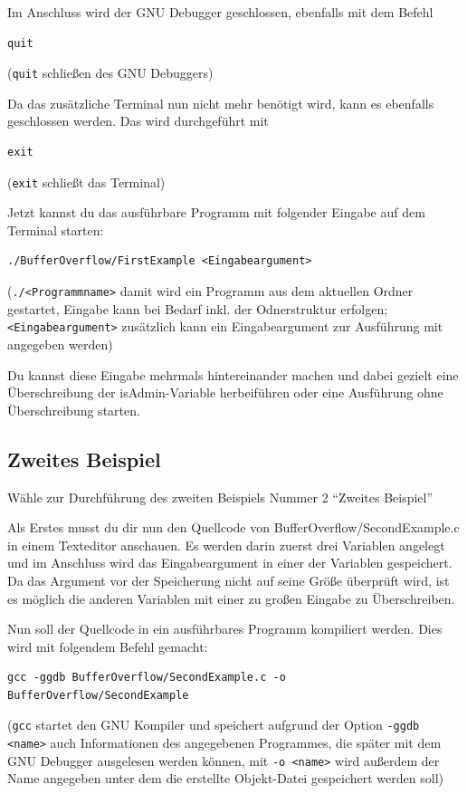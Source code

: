 Im Anschluss wird der GNU Debugger geschlossen, ebenfalls mit dem Befehl
\begin{lstlisting}
quit
\end{lstlisting}
(\colorbox{altgray}{\lstinline|quit|} schließen des GNU Debuggers)

Da das zusätzliche Terminal nun nicht mehr benötigt wird, kann es ebenfalls geschlossen werden. Das wird durchgeführt mit
\begin{lstlisting}
exit
\end{lstlisting}
(\colorbox{altgray}{\lstinline|exit|} schließt das Terminal)

Jetzt kannst du das ausführbare Programm mit folgender Eingabe auf dem Terminal starten:
\begin{lstlisting}
./BufferOverflow/FirstExample <Eingabeargument>
\end{lstlisting}
(\colorbox{altgray}{\lstinline|./<Programmname>|} damit wird ein Programm aus dem aktuellen Ordner gestartet, Eingabe kann bei Bedarf inkl. der Odnerstruktur erfolgen; \\
\colorbox{altgray}{\lstinline|<Eingabeargument>|} zusätzlich kann ein Eingabeargument zur Ausführung mit angegeben werden)

Du kannst diese Eingabe mehrmals hintereinander machen und dabei gezielt eine Überschreibung der isAdmin-Variable herbeiführen oder eine Ausführung ohne Überschreibung starten.

\subsection{Zweites Beispiel}
Wähle zur Durchführung des zweiten Beispiels Nummer 2 \enquote{Zweites Beispiel}

Als Erstes musst du dir nun den Quellcode von BufferOverflow/SecondExample.c in einem Texteditor anschauen. Es werden darin zuerst drei Variablen angelegt und im Anschluss wird das Eingabeargument in einer der Variablen gespeichert. Da das Argument vor der Speicherung nicht auf seine Größe überprüft wird, ist es möglich die anderen Variablen mit einer zu großen Eingabe zu Überschreiben.

Nun soll der Quellcode in ein ausführbares Programm kompiliert werden. Dies wird mit folgendem Befehl gemacht:
\begin{lstlisting}
gcc -ggdb BufferOverflow/SecondExample.c -o BufferOverflow/SecondExample
\end{lstlisting}
(\colorbox{altgray}{\lstinline|gcc|} startet den GNU Kompiler und speichert aufgrund der Option \colorbox{altgray}{\lstinline|-ggdb <name>|} auch Informationen des angegebenen Programmes, die später mit dem GNU Debugger ausgelesen werden können, mit \colorbox{altgray}{\lstinline|-o <name>|} wird außerdem der Name angegeben unter dem die erstellte Objekt-Datei gespeichert werden soll)

